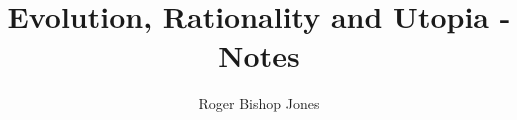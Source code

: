 \documentclass[10pt,a4paper,titlepage,openany,twocolumn]{book}
\begin{document}
\author{Roger Bishop Jones}
\title{Evolution, Rationality and Utopia - Notes}
\maketitle
\tableofcontents
\end{document}
